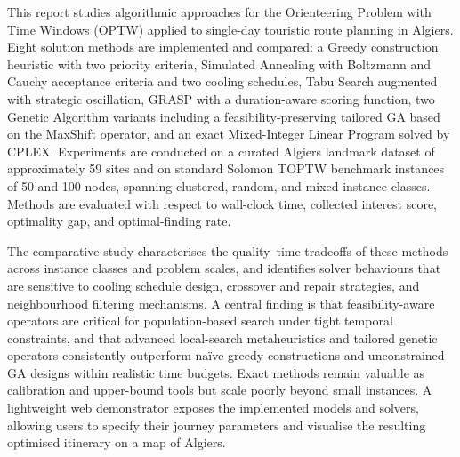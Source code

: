 This report studies algorithmic approaches for the Orienteering Problem with Time Windows (OPTW) applied to single-day touristic route planning in Algiers. Eight solution methods are implemented and compared: a Greedy construction heuristic with two priority criteria, Simulated Annealing with Boltzmann and Cauchy acceptance criteria and two cooling schedules, Tabu Search augmented with strategic oscillation, GRASP with a duration-aware scoring function, two Genetic Algorithm variants including a feasibility-preserving tailored GA based on the MaxShift operator, and an exact Mixed-Integer Linear Program solved by CPLEX. Experiments are conducted on a curated Algiers landmark dataset of approximately 59 sites and on standard Solomon TOPTW benchmark instances of 50 and 100 nodes, spanning clustered, random, and mixed instance classes. Methods are evaluated with respect to wall-clock time, collected interest score, optimality gap, and optimal-finding rate.
 
The comparative study characterises the quality--time tradeoffs of these methods across instance classes and problem scales, and identifies solver behaviours that are sensitive to cooling schedule design, crossover and repair strategies, and neighbourhood filtering mechanisms. A central finding is that feasibility-aware operators are critical for population-based search under tight temporal constraints, and that advanced local-search metaheuristics and tailored genetic operators consistently outperform na\"ive greedy constructions and unconstrained GA designs within realistic time budgets. Exact methods remain valuable as calibration and upper-bound tools but scale poorly beyond small instances. A lightweight web demonstrator exposes the implemented models and solvers, allowing users to specify their journey parameters and visualise the resulting optimised itinerary on a map of Algiers.